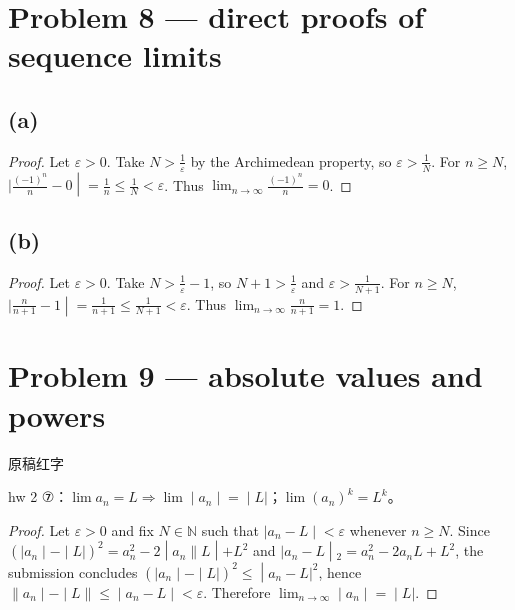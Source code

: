\section{Problem 8 --- direct proofs of sequence limits}

\subsection{(a)}

\begin{proof}

Let \(\varepsilon > 0\). Take \(N > \frac{1}{\varepsilon}\) by the Archimedean property, so \(\varepsilon > \frac{1}{N}\). For \(n \geq N\), \(\left. |\frac{\left( {- 1} \right)^{n}}{n} - 0 \middle| = \frac{1}{n} \leq \frac{1}{N} < \varepsilon \right.\). Thus \(\lim_{n\rightarrow\infty}\frac{\left( {- 1} \right)^{n}}{n} = 0\).

\end{proof}

\subsection{(b)}

\begin{proof}

Let \(\varepsilon > 0\). Take \(N > \frac{1}{\varepsilon} - 1\), so \(N + 1 > \frac{1}{\varepsilon}\) and \(\varepsilon > \frac{1}{N + 1}\). For \(n \geq N\), \(\left. |\frac{n}{n + 1} - 1 \middle| = \frac{1}{n + 1} \leq \frac{1}{N + 1} < \varepsilon \right.\). Thus \(\lim_{n\rightarrow\infty}\frac{n}{n + 1} = 1\).

\end{proof}

\section{Problem 9 --- absolute values and powers}

\begin{qlnote}{原稿红字}

hw 2 ⑦：\(\left. \lim a_{n} = L\Rightarrow\lim \middle| a_{n} \middle| = \middle| L| \right.\)；\({\lim\left( a_{n} \right)}^{k} = L^{k}\)。

\end{qlnote}

\begin{proof}

Let \(\varepsilon > 0\) and fix \(N \in \mathbb{N}\) such that \(\left. |a_{n} - L \middle| < \varepsilon \right.\) whenever \(n \geq N\). Since \(\left. \left( |a_{n} \middle| - \middle| L| \right)^{2} = a_{n}^{2} - 2 \middle| a_{n}\| L \middle| + L^{2} \right.\) and \(\left. |a_{n} - L \middle| {}_{2} = a_{n}^{2} - 2a_{n}L + L^{2} \right.\), the submission concludes \(\left. \left( |a_{n} \middle| - \middle| L| \right)^{2} \leq \middle| a_{n} - L|^{2} \right.\), hence \(\left. \| a_{n} \middle| - \middle| L\| \leq \middle| a_{n} - L \middle| < \varepsilon \right.\). Therefore \(\left. \lim_{n\rightarrow\infty} \middle| a_{n} \middle| = \middle| L| \right.\).

\end{proof}

